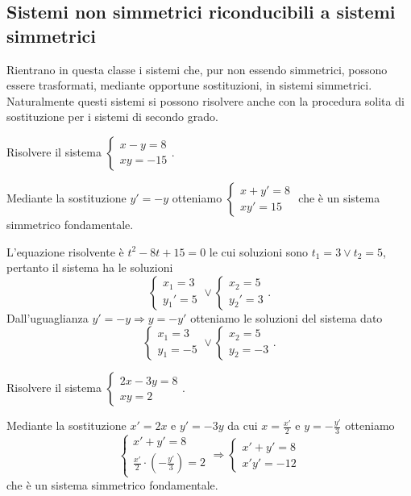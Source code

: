 \subsection{Sistemi non simmetrici riconducibili a sistemi simmetrici}
Rientrano in questa classe i sistemi che, pur non essendo simmetrici, possono essere trasformati, mediante opportune sostituzioni, in sistemi simmetrici. Naturalmente questi sistemi si possono risolvere anche con la procedura solita di sostituzione per i sistemi di secondo grado.

\begin{exrig}
\begin{esempio}
Risolvere il sistema $\left\{\begin{array}{l}{x-y=8}\\{{xy}=-15}\end{array}\right.$.

Mediante la sostituzione $y'=-y$ otteniamo $\left\{\begin{array}{l}{x+y'=8}\\{xy'=15}\end{array}\right.$ che è un sistema simmetrico fondamentale.

L'equazione risolvente è $t^2-8t+15=0$ le cui soluzioni sono $t_1=3\vee t_2=5$, pertanto il sistema ha le soluzioni 
\[\left\{\begin{array}{l}{x_1=3}\\
{{y_1}'=5}\end{array}\right.\vee 
\left\{\begin{array}{l}{x_2=5}\\
{{y_2}'=3}\end{array}\right..\] 
Dall'uguaglianza $y'=-y\Rightarrow y=-y'$ otteniamo le soluzioni del sistema dato 
\[\left\{\begin{array}{l}{x_1=3}\\
{y_1=-5}\end{array}\right.\vee 
\left\{\begin{array}{l}{x_2=5}\\
{y_2=-3}\end{array}\right..\]
\end{esempio}

\begin{esempio}
Risolvere il sistema $\left\{\begin{array}{l}{2x-3y=8}\\{{xy}=2}\end{array}\right.$.

Mediante la sostituzione $x'=2x$ e $y'=-3y$ da cui $x=\frac{x'} 2$ e $y=-\frac{y'} 3$ otteniamo 
\[\left\{\begin{array}{l}{x'+y'=8}\\
{\frac{x'} 2\cdot \left(-\frac{y'} 3\right)=2}\end{array}\right.
\Rightarrow\left\{\begin{array}{l}{x'+y'=8}\\
{x'y'=-12}\end{array}\right.\] che è un sistema simmetrico fondamentale.


\end{esempio}
\end{exrig}
